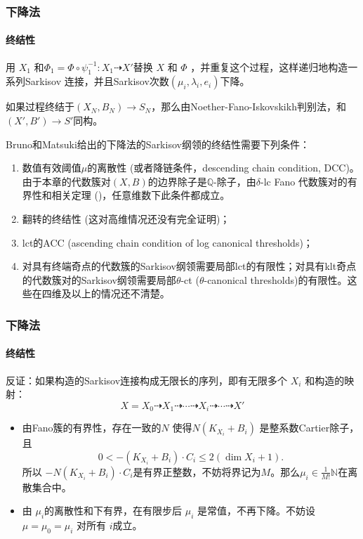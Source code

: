 \documentclass[10pt]{ctexbeamer}
\begin{document}
\begin{frame}[shrink]
  \frametitle{下降法}
  \framesubtitle{终结性}
  用 $X_{1}$ 和$\Phi_{1}=\Phi\circ\psi_1^{-1}: X_1\dashrightarrow X'$替换 $X$ 和 $\Phi$ ，并重复这个过程，这样递归地构造一系列Sarkisov 连接，并且Sarkisov次数$(\mu_{i},\lambda_{i},e_{i})$下降。

\pause
如果过程终结于$(X_{N},B_{N})\to S_{N}$，那么由Noether-Fano-Iskovskikh判别法，和$(X',B')\to S'$同构。
    \pause

Bruno和Matsuki\cite{brunoLogSarkisovProgram1995}给出的下降法的Sarkisov纲领的终结性需要下列条件：
\begin{enumerate}
  \item 数值有效阈值$\mu$的离散性 (或者降链条件，descending chain condition, DCC)。由于本章的代数簇对$(X,B)$的边界除子是$\mathbb{Q}$-除子，由$\delta$-lc Fano 代数簇对的有界性和相关定理 (\citeauthor[Theorem 1.1]{birkarSingularitiesLinearSystems2020})，任意维数下此条件都成立。
  \item 翻转的终结性 (这对高维情况还没有完全证明)； 
  \item lct的ACC (ascending chain condition of log canonical thresholds)；
  \item 对具有终端奇点的代数簇的Sarkisov纲领需要局部lct的有限性；对具有klt奇点的代数簇对的Sarkisov纲领需要局部$\theta$-ct ($\theta$-canonical thresholds)的有限性。这些在四维及以上的情况还不清楚。
\end{enumerate}

\end{frame}
\begin{frame}[shrink]
  \frametitle{下降法}
  \framesubtitle{终结性}
反证：如果构造的Sarkisov连接构成无限长的序列，即有无限多个 $ X_i $ 和构造的映射：
\[ X=X_0\dashrightarrow X_1\dashrightarrow \cdots\dashrightarrow X_i \dashrightarrow\cdots\dashrightarrow X'\]
\begin{itemize}
  \pause
  \item 由Fano簇的有界性，存在一致的$N$ 使得$N(K_{X_{i}}+B_{i})$ 是整系数Cartier除子，且
    \[ 0<-(K_{X_{i}}+B_{i})\cdot C_{i} \leqslant 2(\dim X_{i}+1). \]
    所以 $-N(K_{X_{i}}+B_{i})\cdot C_{i} $是有界正整数，不妨将界记为$M $。那么$\mu_{i}\in \frac{1}{M!} \mathbb{N}$在离散集合中。
  \pause
  \item 由 $\mu_{i}$的离散性和下有界，在有限步后 $\mu_{i}$ 是常值，不再下降。不妨设 $\mu=\mu_{0}=\mu_{i}$ 对所有 $i$成立。
\end{itemize}
\end{frame}
\end{document}
